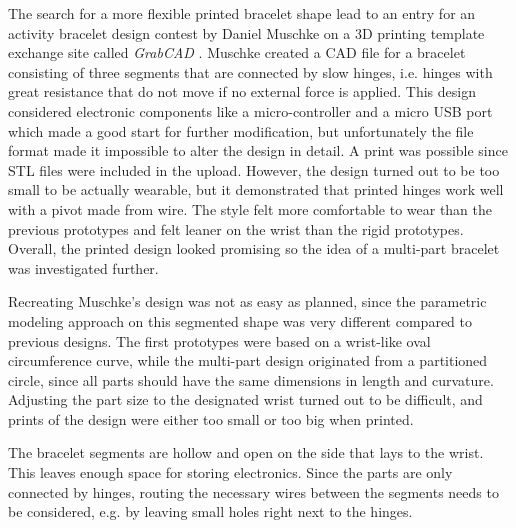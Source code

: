 The search for a more flexible printed bracelet shape lead to an entry for an activity bracelet design contest by Daniel Muschke on a 3D printing template exchange site called \textit{GrabCAD} \cite{amicobracelet}. Muschke created a \ac{CAD} file for a bracelet consisting of three segments that are connected by slow hinges, i.e. hinges with great resistance that do not move if no external force is applied. This design considered electronic components like a micro-controller and a micro \ac{USB} port which made a good start for further modification, but unfortunately the file format made it impossible to alter the design in detail. A print was possible since \ac{STL} files were included in the upload. However, the design turned out to be too small to be actually wearable, but it demonstrated that printed hinges work well with a pivot made from wire. The style felt more comfortable to wear than the previous prototypes and felt leaner on the wrist than the rigid prototypes. Overall, the printed design looked promising so the idea of a multi-part bracelet was investigated further.

Recreating Muschke's design was not as easy as planned, since the parametric modeling approach on this segmented shape was very different compared to previous designs. The first prototypes were based on a wrist-like oval circumference curve, while the multi-part design originated from a partitioned circle, since all parts should have the same dimensions in length and curvature. Adjusting the part size to the designated wrist turned out to be difficult, and prints of the design were either too small or too big when printed.

The bracelet segments are hollow and open on the side that lays to the wrist. This leaves enough space for storing electronics. Since the parts are only connected by hinges, routing the necessary wires between the segments needs to be considered, e.g. by leaving small holes right next to the hinges.

